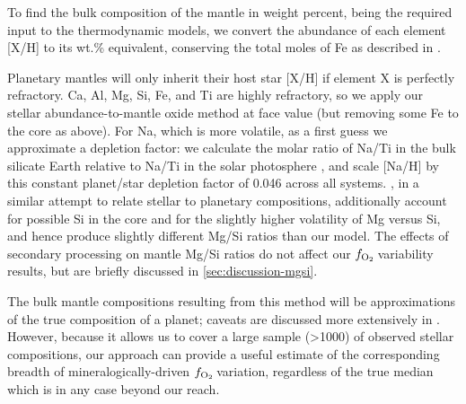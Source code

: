 \documentclass[fleqn,usenatbib,twocolumn]{mnras}
\newcommand{\fo}{$f_{\ce{O2}}$}
\newcommand{\todo}[1]{\textit{\textcolor{violet}{{#1}}}}
\begin{document}

To find the bulk composition of the mantle in weight percent, being the required input to the thermodynamic models, we convert the abundance of each element [X/H] to its wt.\% equivalent, conserving the total moles of Fe as described in \citet[n.b. here we interpret their FeO as FeO*]{guimond_mantle_2023}.

Planetary mantles will only inherit their host star [X/H] if element X is perfectly refractory. Ca, Al, Mg, Si, Fe, and Ti are highly refractory, so we apply our stellar abundance-to-mantle oxide method at face value (but removing some Fe to the core as above). For Na, which is more volatile, as a first guess we approximate a depletion factor: we calculate the molar ratio of Na/Ti in the bulk silicate Earth \citep{workman_major_2005} relative to Na/Ti in the solar photosphere \citep{lodders_abundances_2009}, and scale [Na/H] by this constant planet/star depletion factor of 0.046 across all systems. \citet{spaargaren_plausible_2022}, in a similar attempt to relate stellar to planetary compositions, additionally account for possible Si in the core and for the slightly higher volatility of Mg versus Si, and hence produce slightly different Mg/Si ratios than our model. The effects of secondary processing on mantle Mg/Si ratios do not affect our \fo\,variability results, but are briefly discussed in \ref{sec:discussion-mgsi}.%

The bulk mantle compositions resulting from this method will be approximations of the true composition of a planet; caveats are discussed more extensively in \citet{guimond_mantle_2023}. However, because it allows us to cover a large sample (\textgreater 1000) of observed stellar compositions, our approach can provide a useful estimate of the corresponding breadth of mineralogically-driven \fo\,variation, regardless of the true median which is in any case beyond our reach. %
\end{document}
